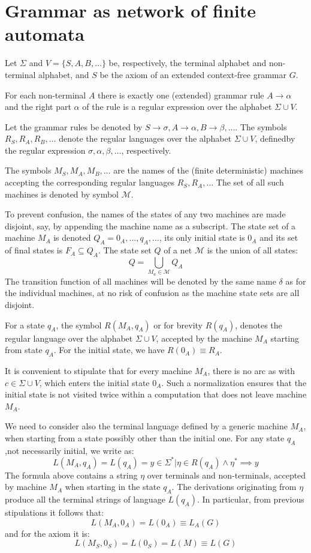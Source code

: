 \section{Grammar as network of finite automata}

Let $\Sigma$ and $V=\{S,A,B,\dots\}$ be, respectively, the terminal alphabet and non-terminal alphabet, and $S$ be the axiom of an extended context-free grammar $G$.

For each non-terminal $A$ there is exactly one (extended) grammar rule $A\rightarrow\alpha$ and the right part $\alpha$ of the rule is a regular expression over the 
alphabet $\Sigma \cup V$.

Let the grammar rules be denoted by $S\rightarrow\sigma,A\rightarrow\alpha,B\rightarrow\beta,\dots$. The symbols $R_S,R_A,R_B,\dots$ denote the regular languages 
over the alphabet $\Sigma \cup V$, definedby the regular expression $\sigma,\alpha,\beta,\dots$, respectively. 

The symbols $M_S,M_A,M_B,\dots$ are the names of the (finite deterministic) machines accepting the corresponding regular languages $R_S,R_A,\dots$ The set of all 
such machines is denoted by symbol $\mathcal{M}$.

To prevent confusion, the names of the states of any two machines are made disjoint, say, by appending the machine name as a subscript. The state set of a machine
$M_A$ is denoted $Q_A={0_A,\dots,q_A,\dots}$, its only initial state is $0_A$ and its set of final states is $F_A\subseteq Q_A$. The state set $Q$ of a net $\mathcal{M}$
is the union of all states:
\[Q=\bigcup_{M_a \in \mathcal{M}}{Q_A}\]
The transition function of all machines will be denoted by the same name $\delta$ as for the individual machines, at no risk of confusion as the machine state sets 
are all disjoint.

For a state $q_A$, the symbol $R(M_A,q_A)$ or for brevity $R(q_A)$, denotes the regular language over the alphabet $\Sigma \cup V$, accepted by the machine $M_A$ 
starting from state $q_A$. For the initial state, we have $R(0_A)\equiv R_A$.

It is convenient to stipulate that for every machine $M_A$, there is no arc as with $c \in \Sigma \cup V$, which enters the initial state $0_A$. Such a normalization 
ensures that the initial state is not visited twice within a computation that does not leave machine $M_A$.

We need to consider also the terminal language defined by a generic machine $M_A$, when starting from a state possibly other than the initial one. For any state
$q_A$,not necessarily initial, we write as: 
\[L(M_A,q_A)=L(q_A)=y \in \Sigma^{*}|\eta\in R(q_A) \land \eta^{*} \implies y\]
The formula above contains a string $\eta$ over terminals and non-terminals, accepted by machine $M_A$ when starting in the state $q_A$. The derivations 
originating from $\eta$ produce all the terminal strings of language $L(q_A)$. In particular, from previous stipulations it follows that: 
\[L(M_A,0_A)=L(0_A)\equiv L_A(G)\]
and for the axiom it is:
\[L(M_S,0_S)=L(0_S)=L(M)\equiv L(G)\]